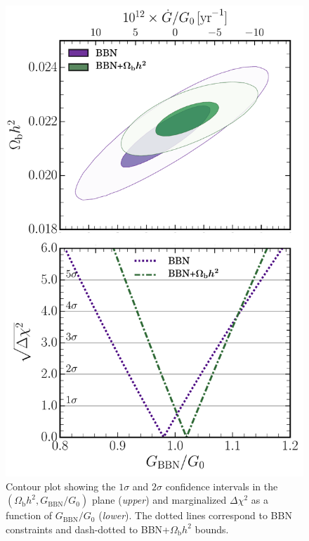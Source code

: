 \documentclass[notitlepage,twocolumn,letterpaper,natbib,aps,prl,amsmath,amsfonts,nofootinbib,preprintnumbers,superscriptaddress,secnumarabic,groupedaddress]{revtex4-1}
\begin{document}
\begin{figure}[t]
    \centering
    \includegraphics[width=\linewidth]{bounds.pdf}\vspace{-0.3cm}
    \caption{Contour plot showing the $1\sigma$ and $2\sigma$ confidence intervals in the $(\Omega_{\mathrm{b}}h^2, G_{\mathrm{BBN}}/G_0)$ plane (\emph{upper}) and marginalized $\Delta \chi^2$ as a function of $G_{\mathrm{BBN}}/G_0$ (\emph{lower}). The dotted lines correspond to BBN constraints and dash-dotted to BBN+$\Omega_{\mathrm{b}}h^2$ bounds.}
    \label{fig:bounds}
\end{figure}
\end{document}
